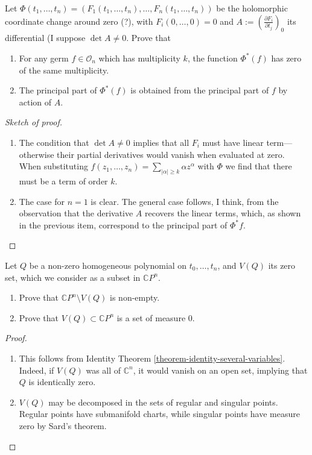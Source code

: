 \begin{exercise}
\label{exercise-principal-part-under-coordinate-change}
Let $\Phi(t_1,\ldots,t_n)=(F_1(t_1,\ldots,t_n),\ldots,F_n(t_1,\ldots,t_n))$ be
the holomorphic coordinate change around zero (?), with $F_i(0,\ldots,0)=0$ and
$A:=\left(\frac{\partial F_i}{\partial t_j}\right)_0$ its differential (I suppose
$\det A \neq 0$. Prove that
\begin{enumerate}
\item For any germ $f\in \mathcal{O}_n$ which has multiplicity $k$, the function
$\Phi^*(f)$ has zero of the same multiplicity.
\item The principal part of $\Phi^*(f)$ is obtained from the principal part of
$f$ by action of $A$.
\end{enumerate}
\end{exercise}

\begin{proof}[Sketch of proof]
\begin{enumerate}
\item The condition that $\det A \neq 0$ implies that all $F_i$ must have linear
term---otherwise their partial derivatives would vanish when evaluated at zero.
When substituting $f(z_1,\ldots,z_n)=\sum_{|\alpha|\geq k}\alpha z^\alpha$ with
$\Phi$ we find that there must be a term of order $k$.
\item The case for $n=1$ is clear. The general case follows, I think, from the
observation that the derivative $A$ recovers the linear terms, which, as shown
in the previous item, correspond to the principal part of $\Phi^*f$.
\end{enumerate}
\end{proof}

\begin{exercise}
\label{exercise-zero-locus-of-homogeneous-polynomial}
Let $Q$ be a non-zero homogeneous polynomial on $t_0,\ldots,t_n$, and $V(Q)$ its
zero set, which we consider as a subset in $\mathbb{C}P^{n}$.
\begin{enumerate}
\item Prove that $\mathbb{C}P^{n}\setminus V(Q)$ is non-empty.
\item Prove that $V(Q)\subset\mathbb{C}P^{n}$ is a set of measure 0.
\end{enumerate}
\end{exercise}

\begin{proof}
\begin{enumerate}
\item This follows from Identity Theorem
\ref{theorem-identity-several-variables}. Indeed, if $V(Q)$ was all of
$\mathbb{C}^{n}$, it would vanish on an open set, implying that $Q$ is
identically zero.
\item $V(Q)$ may be decomposed in the sets of regular and singular points.
Regular points have submanifold charts, while singular points have measure zero
by Sard's theorem.
\end{enumerate}
\end{proof}

